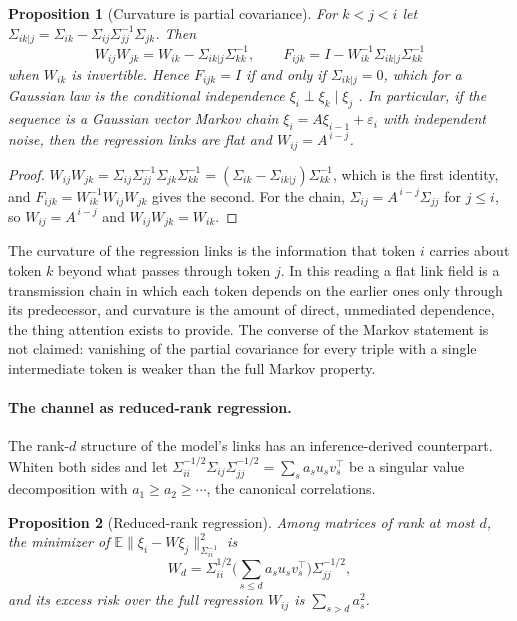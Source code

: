 \documentclass[11pt]{article}
\newtheorem{proposition}{Proposition}
\theoremstyle{definition}
\theoremstyle{remark}
\begin{document}
\begin{proposition}[Curvature is partial covariance]
\label{prop:markov}
For $k<j<i$ let $\Sigma_{ik|j}=\Sigma_{ik}-\Sigma_{ij}\Sigma_{jj}^{-1}\Sigma_{jk}$. Then
\begin{equation}
W_{ij}W_{jk}=W_{ik}-\Sigma_{ik|j}\Sigma_{kk}^{-1},\qquad F_{ijk}=I-W_{ik}^{-1}\Sigma_{ik|j}\Sigma_{kk}^{-1}
\label{eq:partialcov}
\end{equation}
when $W_{ik}$ is invertible. Hence $F_{ijk}=I$ if and only if $\Sigma_{ik|j}=0$, which for a Gaussian law is the conditional independence $\xi_i\perp\xi_k\mid\xi_j$ \cite{lauritzen1996}. In particular, if the sequence is a Gaussian vector Markov chain $\xi_i=A\xi_{i-1}+\varepsilon_i$ with independent noise, then the regression links are flat and $W_{ij}=A^{\,i-j}$.
\end{proposition}

\begin{proof}
$W_{ij}W_{jk}=\Sigma_{ij}\Sigma_{jj}^{-1}\Sigma_{jk}\Sigma_{kk}^{-1}=(\Sigma_{ik}-\Sigma_{ik|j})\Sigma_{kk}^{-1}$, which is the first identity, and $F_{ijk}=W_{ik}^{-1}W_{ij}W_{jk}$ gives the second. For the chain, $\Sigma_{ij}=A^{\,i-j}\Sigma_{jj}$ for $j\le i$, so $W_{ij}=A^{\,i-j}$ and $W_{ij}W_{jk}=W_{ik}$.
\end{proof}

The curvature of the regression links is the information that token $i$ carries about token $k$ beyond what passes through token $j$. In this reading a flat link field is a transmission chain in which each token depends on the earlier ones only through its predecessor, and curvature is the amount of direct, unmediated dependence, the thing attention exists to provide. The converse of the Markov statement is not claimed: vanishing of the partial covariance for every triple with a single intermediate token is weaker than the full Markov property.

\paragraph{The channel as reduced-rank regression.}
The rank-$d$ structure of the model's links has an inference-derived counterpart. Whiten both sides and let $\Sigma_{ii}^{-1/2}\Sigma_{ij}\Sigma_{jj}^{-1/2}=\sum_sa_su_sv_s^\top$ be a singular value decomposition with $a_1\ge a_2\ge\cdots$, the canonical correlations.

\begin{proposition}[Reduced-rank regression]
\label{prop:rrr}
Among matrices of rank at most $d$, the minimizer of $\mathbb E\|\xi_i-W\xi_j\|^2_{\Sigma_{ii}^{-1}}$ is
\begin{equation}
W_d=\Sigma_{ii}^{1/2}\Big(\sum_{s\le d}a_su_sv_s^\top\Big)\Sigma_{jj}^{-1/2},
\label{eq:rrr}
\end{equation}
and its excess risk over the full regression $W_{ij}$ is $\sum_{s>d}a_s^2$.
\end{proposition}
\end{document}
